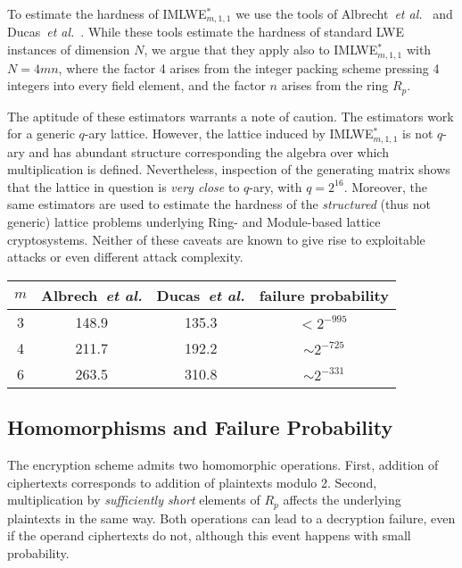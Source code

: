 To estimate the hardness of IMLWE$^*_{m, 1, 1}$ we use the tools of Albrecht~\emph{et al.}~\cite{albrecht-estimator} and Ducas~\emph{et al.}~\cite{ducas-estimator}. While these tools estimate the hardness of standard LWE instances of dimension $N$, we argue that they apply also to IMLWE$^*_{m,1,1}$ with $N = 4 m n$, where the factor 4 arises from the integer packing scheme pressing 4 integers into every field element, and the factor $n$ arises from the ring $R_p$.

The aptitude of these estimators warrants a note of caution. The estimators work for a generic $q$-ary lattice. However, the lattice induced by IMLWE$^*_{m,1,1}$ is not $q$-ary and has abundant structure corresponding the algebra over which multiplication is defined. Nevertheless, inspection of the generating matrix shows that the lattice in question is \emph{very close} to $q$-ary, with $q = 2^{16}$. Moreover, the same estimators are used to estimate the hardness of the \emph{structured} (thus not generic) lattice problems underlying Ring- and Module-based lattice cryptosystems. Neither of these caveats are known to give rise to exploitable attacks or even different attack complexity.

\begin{table}
\centering
\begin{tabular}{c||c|c|c}
$m$ & Albrech~\emph{et al.} & Ducas~\emph{et al.} & failure probability \\ \hline
3 & 148.9 & 135.3 & $< 2^{-995\phantom{\vert}}$ \\
4 & 211.7 & 192.2 & $\sim 2^{-725}$ \\
6 & 263.5 & 310.8 & $\sim 2^{-331}$
\end{tabular}
\end{table}

\subsection{Homomorphisms and Failure Probability}

The encryption scheme admits two homomorphic operations. First, addition of ciphertexts corresponds to addition of plaintexts modulo 2. Second, multiplication by \emph{sufficiently short} elements of $R_p$ affects the underlying plaintexts in the same way. Both operations can lead to a decryption failure, even if the operand ciphertexts do not, although this event happens with small probability.

